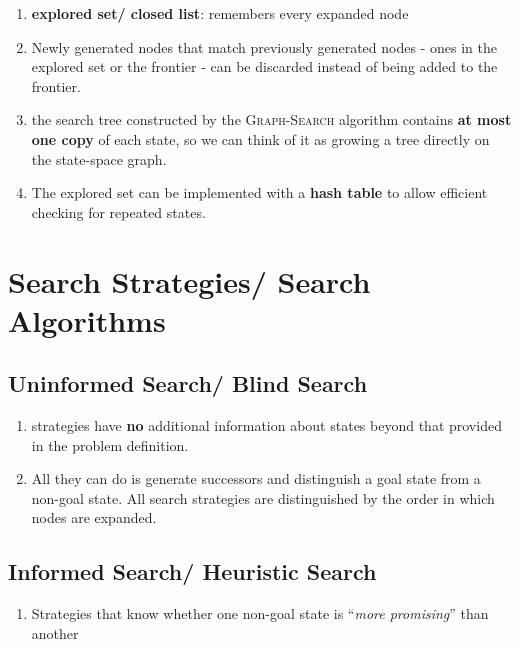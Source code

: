 \begin{enumerate}
    \item \textbf{explored set/ closed list}: remembers every expanded node
    \hfill \cite{ai/book/Artificial-Intelligence-A-Modern-Approach/Russell-Norvig}

    \item Newly generated nodes that match previously generated nodes - ones in the explored set or the frontier - can be discarded instead of being added to the frontier. 
    \hfill \cite{ai/book/Artificial-Intelligence-A-Modern-Approach/Russell-Norvig}

    \item the search tree constructed by the \textsc{Graph-Search} algorithm contains \textbf{at most one copy} of each state, so we can think of it as growing a tree directly on the state-space graph.
    \hfill \cite{ai/book/Artificial-Intelligence-A-Modern-Approach/Russell-Norvig}

    \item The explored set can be implemented with a \textbf{hash table} to allow efficient checking for repeated states.
    \hfill \cite{ai/book/Artificial-Intelligence-A-Modern-Approach/Russell-Norvig}

    
\end{enumerate}



\section{Search Strategies/ Search Algorithms}

\subsection{Uninformed Search/ Blind Search}

\begin{enumerate}
    \item strategies have \textbf{no} additional information about states beyond that provided in the problem definition.
    \hfill \cite{ai/book/Artificial-Intelligence-A-Modern-Approach/Russell-Norvig}

    \item All they can do is generate successors and distinguish a goal state from a non-goal state. All search strategies are distinguished by the order in which nodes are expanded. 
    \hfill \cite{ai/book/Artificial-Intelligence-A-Modern-Approach/Russell-Norvig}
\end{enumerate}




\subsection{Informed Search/ Heuristic Search}

\begin{enumerate}
    \item Strategies that know whether one non-goal state is “\textit{more promising}” than another 
    \hfill \cite{ai/book/Artificial-Intelligence-A-Modern-Approach/Russell-Norvig}

    
\end{enumerate}














